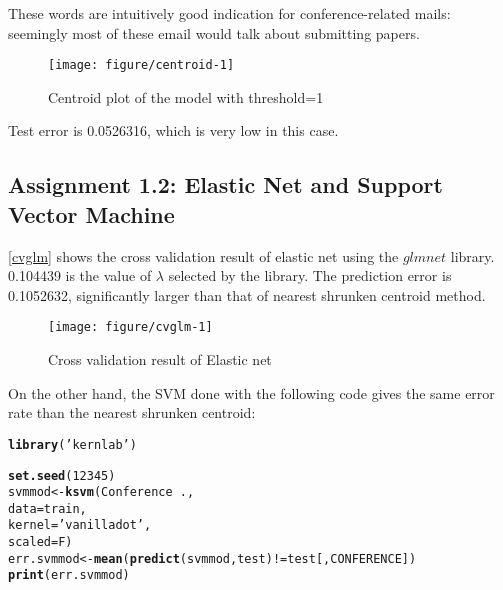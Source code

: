 \documentclass[11pt,english]{article}\usepackage[]{graphicx}\usepackage[]{color}
\makeatletter
\def\maxwidth{ %
  \ifdim\Gin@nat@width>\linewidth
    \linewidth
  \else
    \Gin@nat@width
  \fi
}
\newcommand{\hlnum}[1]{\textcolor[rgb]{0.686,0.059,0.569}{#1}}%
\newcommand{\hlstr}[1]{\textcolor[rgb]{0.192,0.494,0.8}{#1}}%
\newcommand{\hlopt}[1]{\textcolor[rgb]{0,0,0}{#1}}%
\newcommand{\hlstd}[1]{\textcolor[rgb]{0.345,0.345,0.345}{#1}}%
\newcommand{\hlkwb}[1]{\textcolor[rgb]{0.69,0.353,0.396}{#1}}%
\newcommand{\hlkwc}[1]{\textcolor[rgb]{0.333,0.667,0.333}{#1}}%
\newcommand{\hlkwd}[1]{\textcolor[rgb]{0.737,0.353,0.396}{\textbf{#1}}}%
\newenvironment{kframe}{%
 \def\at@end@of@kframe{}%
 \ifinner\ifhmode%
  \def\at@end@of@kframe{\end{minipage}}%
  \begin{minipage}{\columnwidth}%
 \fi\fi%
 \def\FrameCommand##1{\hskip\@totalleftmargin \hskip-\fboxsep
 \colorbox{shadecolor}{##1}\hskip-\fboxsep
     \hskip-\linewidth \hskip-\@totalleftmargin \hskip\columnwidth}%
 \MakeFramed {\advance\hsize-\width
   \@totalleftmargin\z@ \linewidth\hsize
   \@setminipage}}%
 {\par\unskip\endMakeFramed%
 \at@end@of@kframe}
\newenvironment{knitrout}{}{} %
\makeatother
\begin{document}
These words are intuitively good indication for conference-related mails:
seemingly most of these email would talk about submitting papers.

\begin{figure}[H]
  \centering
\begin{knitrout}\small
{}\color{fgcolor}
\texttt{[image: figure/centroid-1]} 

\end{knitrout}
\caption{Centroid plot of the model with threshold=1}
\label{centroid}
\end{figure}

Test error is 0.0526316, which is very low in this case.


\subsection*{Assignment 1.2: Elastic Net and Support Vector Machine}


\autoref{cvglm} shows the cross validation result of elastic net using
the $glmnet$ library. 0.104439 is the value of $\lambda$
selected by the library. The prediction error is 0.1052632,
significantly larger than that of nearest shrunken centroid method.

\begin{figure}[H]
  \centering
\begin{knitrout}\small
{}\color{fgcolor}
\texttt{[image: figure/cvglm-1]} 

\end{knitrout}
\caption{Cross validation result of Elastic net}
\label{cvglm}
\end{figure}

On the other hand, the SVM done with the following code gives the same error
rate than the nearest shrunken centroid:
\begin{knitrout}\small
{}\color{fgcolor}\begin{kframe}
\begin{alltt}
\hlkwd{library}\hlstd{(}\hlstr{'kernlab'}\hlstd{)}

\hlkwd{set.seed}\hlstd{(}\hlnum{12345}\hlstd{)}
\hlstd{svmmod} \hlkwb{<-} \hlkwd{ksvm}\hlstd{(Conference} \hlopt{~} \hlstd{.,}
               \hlkwc{data} \hlstd{= train,}
               \hlkwc{kernel} \hlstd{=} \hlstr{'vanilladot'}\hlstd{,}
               \hlkwc{scaled} \hlstd{= F)}
\hlstd{err.svmmod} \hlkwb{<-} \hlkwd{mean}\hlstd{(}\hlkwd{predict}\hlstd{(svmmod, test)} \hlopt{!=} \hlstd{test[,CONFERENCE])}
\hlkwd{print}\hlstd{(err.svmmod)}
\end{alltt}
\end{kframe}
\end{knitrout}
\end{document}
